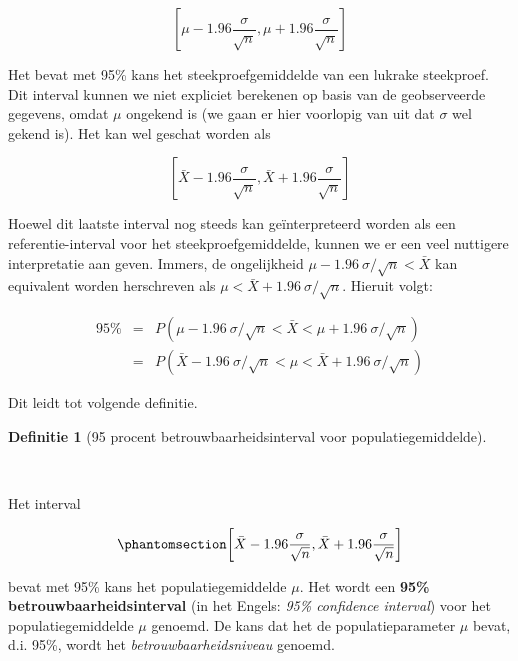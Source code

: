 \documentclass[
  dutch,
  letterpaper,
  12pt]{book}
\theoremstyle{definition}
\theoremstyle{definition}
\newtheorem{definition}{Definitie}[chapter]
\theoremstyle{definition}
\theoremstyle{remark}
\begin{document}
\begin{equation*}
\left[\mu - 1.96 \frac{\sigma}{\sqrt{n}},\mu + 1.96 \frac{\sigma}{\sqrt{n}}%
\right]
\end{equation*}

Het bevat met 95\% kans het steekproefgemiddelde van een lukrake
steekproef. Dit interval kunnen we niet expliciet berekenen op basis van
de geobserveerde gegevens, omdat \(\mu\) ongekend is (we gaan er hier
voorlopig van uit dat \(\sigma\) wel gekend is). Het kan wel geschat
worden als

\begin{equation*}
\left[\bar X - 1.96 \frac{\sigma}{\sqrt{n}},\bar X + 1.96 \frac{\sigma}{\sqrt{n}}\right]
\end{equation*}

Hoewel dit laatste interval nog steeds kan geïnterpreteerd worden als
een referentie-interval voor het steekproefgemiddelde, kunnen we er een
veel nuttigere interpretatie aan geven. Immers, de ongelijkheid
\(\mu - 1.96 \
\sigma/\sqrt{n} < \bar{X}\) kan equivalent worden herschreven als
\(\mu < \bar{X} + 1.96 \ \sigma/\sqrt{n}\). Hieruit volgt:

\begin{eqnarray*}
95\% &=& P( \mu - 1.96 \ \sigma/\sqrt{n} < \bar{X} < \mu + 1.96 \ \sigma/\sqrt{n} ) \\
&=&P( \bar{X} - 1.96 \ \sigma/\sqrt{n} < \mu < \bar{X} + 1.96 \ \sigma/\sqrt{n} )
\end{eqnarray*}

Dit leidt tot volgende definitie.

\begin{definition}[95 procent betrouwbaarheidsinterval voor
populatiegemiddelde]\protect\hypertarget{def-95-procent-betrouwbaarheidsinterval-voor-populatiegemiddelde}{}\label{def-95-procent-betrouwbaarheidsinterval-voor-populatiegemiddelde}

~

\end{definition}

Het interval

\begin{equation}\protect\phantomsection\label{eq-bi}{
\left[\bar X - 1.96 \frac{\sigma}{\sqrt{n}},\bar X + 1.96 \frac{\sigma}{\sqrt{n}}\right]
}\end{equation}

bevat met 95\% kans het populatiegemiddelde \(\mu\). Het wordt een
\textbf{95\% betrouwbaarheidsinterval} (in het Engels: \emph{95\%
confidence interval}) voor het populatiegemiddelde \(\mu\) genoemd. De
kans dat het de populatieparameter \(\mu\) bevat, d.i. 95\%, wordt het
\emph{betrouwbaarheidsniveau} genoemd.
\end{document}
